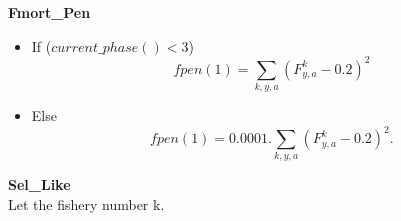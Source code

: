 \documentclass{article}
\begin{document}
\textbf{Fmort\_Pen}\\


\begin{itemize}
    \item If ($current\_phase()<3$)
    \begin{equation}
        fpen(1)=\sum_{k,y,a}(F^k_{y,a}-0.2)^2
    \end{equation}
    \item Else
    \begin{equation}
        fpen(1)=0.0001.\sum_{k,y,a}(F^k_{y,a}-0.2)^2.
    \end{equation}
\end{itemize}

\textbf{Sel\_Like}\\

Let the fishery number k. 
\end{document}
